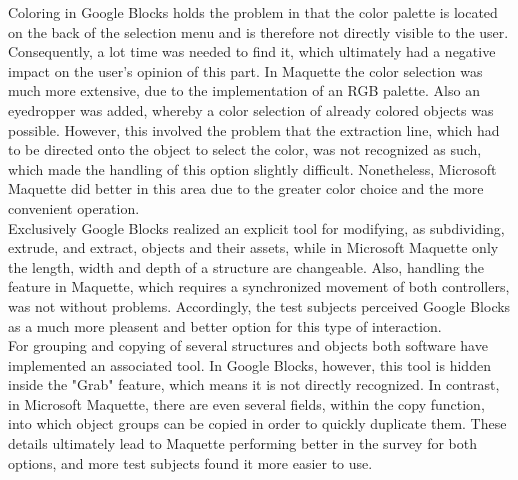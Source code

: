 \documentclass{report}
\begin{document}
			Coloring in Google Blocks holds the problem in that the color palette is located on the back of the selection menu and is therefore not directly visible to the user. Consequently, a lot time was needed to find it, which ultimately had a negative impact on the user's opinion of this part. In Maquette the color selection was much more extensive, due to the implementation of an RGB palette. Also an eyedropper was added, whereby a color selection of already colored objects was possible. However, this involved the problem that the extraction line, which had to be directed onto the object to select the color, was not recognized as such, which made the handling of this option slightly difficult. Nonetheless, Microsoft Maquette did better in this area due to the greater color choice and the more convenient operation. \\
			Exclusively Google Blocks realized an explicit tool for modifying, as subdividing, extrude, and extract, objects and their assets, while in Microsoft Maquette only the length, width and depth of a structure are changeable. Also, handling the feature in Maquette, which requires a synchronized movement of both controllers, was not without problems. Accordingly, the test subjects perceived Google Blocks as a much more pleasent and better option for this type of interaction. \\
			For grouping and copying of several structures and objects both software have implemented an associated tool. In Google Blocks, however, this tool is hidden inside the "Grab" feature, which means it is not directly recognized. In contrast, in Microsoft Maquette, there are even several fields, within the copy function, into which object groups can be copied in order to quickly duplicate them. These details ultimately lead to Maquette performing better in the survey for both options, and more test subjects found it more easier to use. \\
\end{document}
